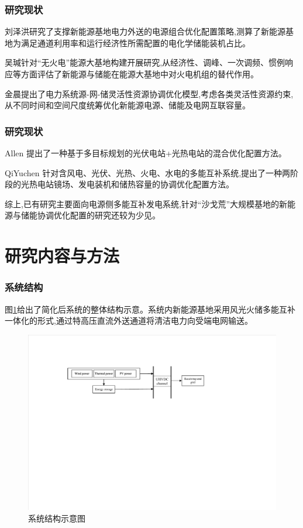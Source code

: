 \documentclass{beamer}
\begin{document}
\begin{frame}
	\frametitle{研究现状} 
	\qquad 刘泽洪研究了支撑新能源基地电力外送的电源组合优化配置策略,测算了新能源基地为满足通道利用率和运行经济性所需配置的电化学储能装机占比。

	\qquad 吴瑊针对“无火电”能源大基地构建开展研究,从经济性、调峰、一次调频、惯例响应等方面评估了新能源与储能在能源大基地中对火电机组的替代作用。
	
	\qquad 金晨提出了电力系统源-网-储灵活性资源协调优化模型,考虑各类灵活性资源约束,从不同时间和空间尺度统筹优化新能源电源、储能及电网互联容量。
\end{frame}

\begin{frame}
	\frametitle{研究现状} 
	\qquad Allen 提出了一种基于多目标规划的光伏电站+光热电站的混合优化配置方法。
	
	\qquad QiYuchen 针对含风电、光伏、光热、火电、水电的多能互补系统,提出了一种两阶段的光热电站镜场、发电装机和储热容量的协调优化配置方法。

	\qquad 综上,已有研究主要面向电源侧多能互补发电系统,针对“沙戈荒”大规模基地的新能源与储能协调优化配置的研究还较为少见。
\end{frame}

\section{研究内容与方法}

\begin{frame}
	\frametitle{系统结构} 
	\qquad 图\ref*{fig.1}给出了简化后系统的整体结构示意。系统内新能源基地采用风光火储多能互补一体化的形式,通过特高压直流外送通道将清洁电力向受端电网输送。
	\begin{figure}[htbp]
		\centering
		\includegraphics[scale=0.6]{./pic/系统结构示意图.pdf}
		\caption{系统结构示意图}
		\label{fig.1}
	\end{figure}
\end{frame}
\end{document}
